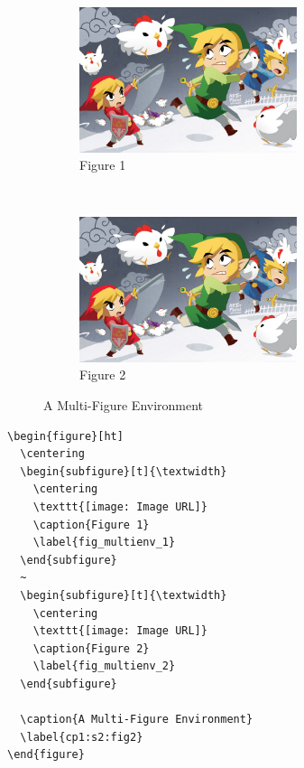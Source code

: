 \documentclass[12pt]{report}
\numberwithin{equation}{section}
\begin{document}
\begin{figure}[ht]
	\centering
	\begin{subfigure}[t]{\textwidth}
		\centering
		\includegraphics[width=0.7\textwidth]{figures/Sample/tumblr_static_eaceks0rfxsss8o4swscw40wo.jpg}
		\caption{Figure 1}
		\label{fig_multienv_1}
	\end{subfigure}
	~
	\begin{subfigure}[t]{\textwidth}
		\centering
		\includegraphics[width=0.7\textwidth]{figures/Sample/tumblr_static_eaceks0rfxsss8o4swscw40wo.jpg}
		\caption{Figure 2}
		\label{fig_multienv_2}
	\end{subfigure}
	
	\caption{A Multi-Figure Environment}
	\label{cp1:s2:fig2}
\end{figure}

\begin{verbatim}
\begin{figure}[ht]
  \centering
  \begin{subfigure}[t]{\textwidth}
    \centering
    \texttt{[image: Image URL]}
    \caption{Figure 1}
    \label{fig_multienv_1}
  \end{subfigure}
  ~
  \begin{subfigure}[t]{\textwidth}
    \centering
    \texttt{[image: Image URL]}
    \caption{Figure 2}
    \label{fig_multienv_2}
  \end{subfigure}

  \caption{A Multi-Figure Environment}
  \label{cp1:s2:fig2}
\end{figure}
\end{verbatim}
\end{document}
